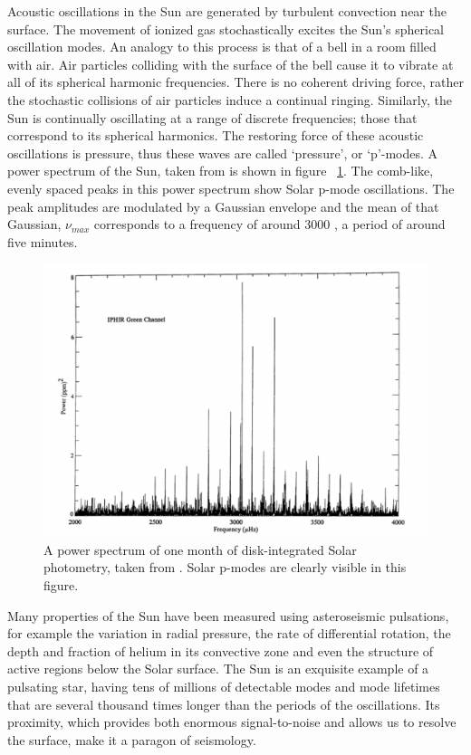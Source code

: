 Acoustic oscillations in the Sun are generated by turbulent convection near
the surface.
The movement of ionized gas stochastically excites the Sun's spherical
oscillation modes.
An analogy to this process is that of a bell in a room filled with air.
Air particles colliding with the surface of the bell cause it to vibrate at
all of its spherical harmonic frequencies.
There is no coherent driving force, rather the stochastic collisions of air
particles induce a continual ringing.
Similarly, the Sun is continually oscillating at a range of discrete
frequencies; those that correspond to its spherical harmonics.
The restoring force of these acoustic oscillations is pressure, thus these
waves are called `pressure', or `p'-modes.
A power spectrum of the Sun, taken from \citet{Brown2000} is shown in figure
~\ref{fig:solar_spectrum}.
The comb-like, evenly spaced peaks in this power spectrum show Solar p-mode
oscillations.
The peak amplitudes are modulated by a Gaussian envelope and the mean of that
Gaussian, $\nu_{max}$ corresponds to a frequency of around 3000 \uHz, a period
of around five minutes.

\begin{figure}[p]
\begin{center}
\includegraphics[width=6in, clip=true]{figures/solar_spectrum.pdf}
\caption[Solar power spectrum.]{A power spectrum of one month of
disk-integrated Solar photometry, taken from \citet{Toutain1992}.
Solar p-modes are clearly visible in this figure.}
\label{fig:solar_spectrum}
\end{center}
\end{figure}

Many properties of the Sun have been measured using asteroseismic pulsations,
for example the variation in radial pressure, the rate of differential
rotation, the depth and fraction of helium in its convective zone and even the
structure of active regions below the Solar surface.
The Sun is an exquisite example of a pulsating star, having tens of millions
of detectable modes and mode lifetimes that are several thousand times longer
than the periods of the oscillations.
Its proximity, which provides both enormous signal-to-noise and allows us to
resolve the surface, make it a paragon of seismology.

